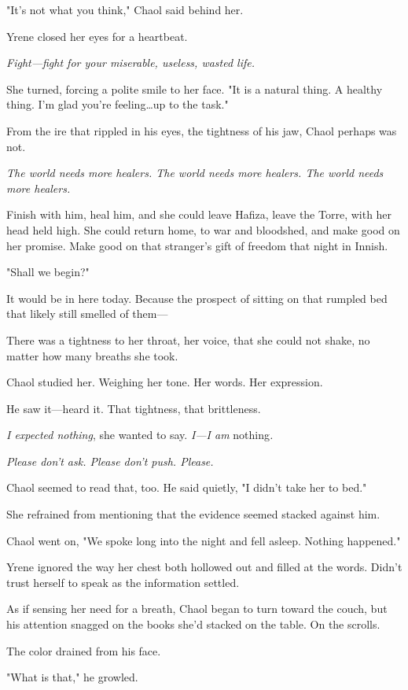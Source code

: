 "It's not what you think," Chaol said behind her.

Yrene closed her eyes for a heartbeat.

\emph{Fight---fight for your miserable, useless, wasted life.}

She turned, forcing a polite smile to her face.
"It is a natural thing.
A healthy thing.
I'm glad you're feeling\ldots up to the task."

From the ire that rippled in his eyes, the tightness of his jaw, Chaol perhaps was not.

\emph{The world needs more healers.
The world needs more healers.
The world needs more healers.}

Finish with him, heal him, and she could leave Hafiza, leave the Torre, with her head held high.
She could return home, to war and bloodshed, and make good on her promise.
Make good on that stranger's gift of freedom that night in Innish.

"Shall we begin?"

It would be in here today.
Because the prospect of sitting on that rumpled bed that likely still smelled of them---

There was a tightness to her throat, her voice, that she could not shake, no matter how many breaths she took.

Chaol studied her.
Weighing her tone.
Her words.
Her expression.

He saw it---heard it.
That tightness, that brittleness.

\emph{I expected nothing}, she wanted to say.
\emph{I---I am}
nothing\emph{.}

\emph{Please don't ask.
Please don't push.
Please.}

Chaol seemed to read that, too.
He said quietly, "I didn't take her to bed."

She refrained from mentioning that the evidence seemed stacked against him.

Chaol went on, "We spoke long into the night and fell asleep.
Nothing happened."

Yrene ignored the way her chest both hollowed out and filled at the words.
Didn't trust herself to speak as the information settled.

As if sensing her need for a breath, Chaol began to turn toward the couch, but his attention snagged on the books she'd stacked on the table.
On the scrolls.

The color drained from his face.

"What is that," he growled.

